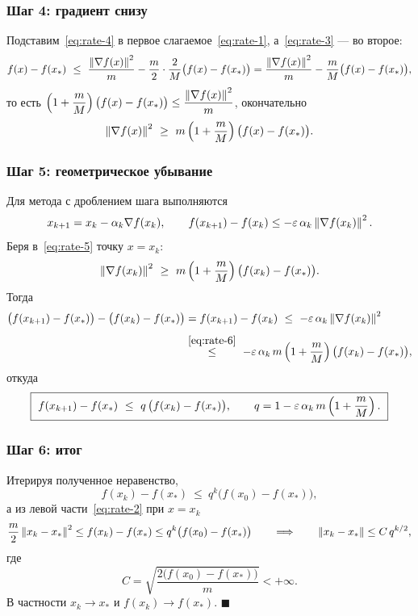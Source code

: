 \subsubsection*{Шаг 4: градиент снизу}

Подставим~\eqref{eq:rate-4} в первое слагаемое~\eqref{eq:rate-1},
а~\eqref{eq:rate-3} — во второе:
\[
  f(x) - f(x_*)
  \ \le\ \frac{\left\lVert \nabla f(x) \right\rVert^2}{m}
       - \frac{m}{2}\cdot\frac{2}{M}\big(f(x) - f(x_*)\big)
  = \frac{\left\lVert \nabla f(x) \right\rVert^2}{m}
       - \frac{m}{M}\big(f(x) - f(x_*)\big) ,
\]
то есть $\left(1 + \dfrac{m}{M}\right)\big(f(x)-f(x_*)\big)
\le \dfrac{\left\lVert \nabla f(x) \right\rVert^2}{m}$, окончательно
\begin{equation}\label{eq:rate-5}
  \left\lVert \nabla f(x) \right\rVert^2 \ \ge\ m\left(1 + \frac{m}{M}\right)
  \big(f(x) - f(x_*)\big) .
\end{equation}

\subsubsection*{Шаг 5: геометрическое убывание}

Для метода с дроблением шага выполняются
\[
  x_{k+1} = x_k - \alpha_k \nabla f(x_k) ,
  \qquad
  f(x_{k+1}) - f(x_k) \le -\varepsilon\,\alpha_k \left\lVert \nabla f(x_k) \right\rVert^2 .
\]
Беря в~\eqref{eq:rate-5} точку $x = x_k$:
\begin{equation}\label{eq:rate-6}
  \left\lVert \nabla f(x_k) \right\rVert^2 \ \ge\ m\left(1 + \frac{m}{M}\right)
  \big(f(x_k) - f(x_*)\big) .
\end{equation}
Тогда
\[
  \begin{aligned}
    \big(f(x_{k+1}) - f(x_*)\big) - \big(f(x_k) - f(x_*)\big)
      &= f(x_{k+1}) - f(x_k)
       \ \le\ -\varepsilon\,\alpha_k \left\lVert \nabla f(x_k) \right\rVert^2 \\[4pt]
      &\overset{\eqref{eq:rate-6}}{\le}\
       -\varepsilon\,\alpha_k\, m\left(1 + \frac{m}{M}\right)
       \big(f(x_k) - f(x_*)\big) ,
  \end{aligned}
\]
откуда
\[
  \boxed{\
  f(x_{k+1}) - f(x_*) \ \le\ q\,\big(f(x_k) - f(x_*)\big) ,
  \qquad
  q = 1 - \eps\,\alpha_k\, m\left(1 + \frac{m}{M}\right) . \ }
\]

\subsubsection*{Шаг 6: итог}

Итерируя полученное неравенство,
\[
  f(x_k) - f(x_*) \ \le\ q^k \big(f(x_0) - f(x_*)\big) ,
\]
а из левой части~\eqref{eq:rate-2} при $x = x_k$
\[
  \frac{m}{2}\left\lVert x_k - x_* \right\rVert^2 \le f(x_k) - f(x_*) \le q^k\big(f(x_0)-f(x_*)\big)
  \qquad\Longrightarrow\qquad
  \left\lVert x_k - x_* \right\rVert \le C\, q^{k/2} ,
\]
где
\[
  C = \sqrt{\frac{2\big(f(x_0) - f(x_*)\big)}{m}} < +\infty .
\]
В частности $x_k \to x_*$ и $f(x_k) \to f(x_*)$. \hfill$\blacksquare$

